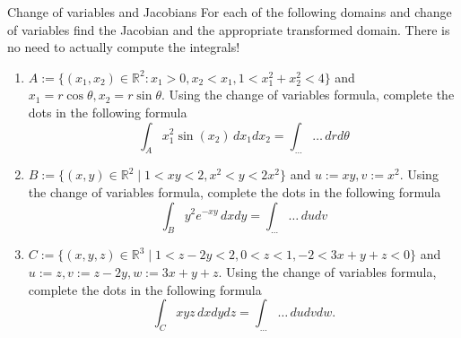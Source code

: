 \documentclass[12pt]{article}
\begin{document}
\begin{problem}{Change of variables and Jacobians}{}
    For each of the following domains and change of variables find the Jacobian and the appropriate transformed domain. There is no need to actually compute the integrals!

\begin{enumerate}
    \item $A := \{(x_1, x_2) \in \mathbb{R}^2 : x_1 > 0, x_2 < x_1, 1 < x_1^2 + x_2^2 < 4\}$ and $x_1 = r \cos \theta, x_2 = r \sin \theta$. Using the change of variables formula, complete the dots in the following formula
    \[
    \int_{A} x_1^2 \sin(x_2) \, dx_1 dx_2 = \int_{\dots} \dots \, dr d\theta
    \]

    \item $B := \{(x, y) \in \mathbb{R}^2 \mid 1 < xy < 2, x^2 < y < 2x^2\}$ and $u := xy, v := x^2$. Using the change of variables formula, complete the dots in the following formula
    \[
    \int_{B} y^2 e^{-xy} \, dx dy = \int_{\dots} \dots \, du dv
    \]

    \item $C := \{(x, y, z) \in \mathbb{R}^3 \mid 1 < z - 2y < 2, 0 < z < 1, -2 < 3x + y + z < 0\}$ and $u := z, v := z - 2y, w := 3x + y + z$. Using the change of variables formula, complete the dots in the following formula
    \[
    \int_{C} xyz \, dx dy dz = \int_{\dots} \dots \, du dv dw.
    \]
\end{enumerate}
\end{problem}
\end{document}

